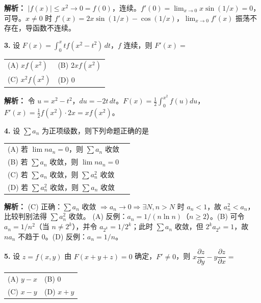 \ifshowsolutions\par\noindent\textbf{解析：} $|f(x)|\leqslant x^2\to0=f(0)$，连续。$f'(0)=\lim_{x\to0}x\sin(1/x)=0$，可导。$x\neq0$ 时 $f'(x)=2x\sin(1/x)-\cos(1/x)$，$\lim_{x\to0}f'(x)$ 振荡不存在，导函数不连续。\else \answerarea \fi

\vspace{8pt}

\textbf{3.} 设 $F(x) = \displaystyle\int_{0}^{x} t f(x^2-t^2)\,dt$，$f$ 连续，则 $F'(x) =$
\begin{center}
\begin{tabular}{ll}
(A) $x f(x^2)$ & (B) $2x f(x^2)$ \\[6pt]
(C) $x^2 f(x^2)$ & (D) $0$
\end{tabular}
\end{center}

\ifshowsolutions\par\noindent\textbf{解析：} 令 $u=x^2-t^2$，$du=-2t\,dt$。$F(x)=\frac{1}{2}\int_{0}^{x^2}f(u)du$，$F'(x)=\frac{1}{2}f(x^2)\cdot2x=x f(x^2)$。\else \answerarea \fi

\vspace{8pt}

\textbf{4.} 设 $\displaystyle\sum a_n$ 为正项级数，则下列命题正确的是
\begin{center}
\begin{tabular}{ll}
(A) 若 $\lim n a_n = 0$，则 $\sum a_n$ 收敛 \\[4pt]
(B) 若 $\sum a_n$ 收敛，则 $\lim n a_n = 0$ \\[4pt]
(C) 若 $\sum a_n$ 收敛，则 $\sum a_n^2$ 收敛 \\[4pt]
(D) 若 $\sum a_n^2$ 收敛，则 $\sum a_n$ 收敛
\end{tabular}
\end{center}

\ifshowsolutions\par\noindent\textbf{解析：} (C) 正确：$\sum a_n$ 收敛 $\Rightarrow a_n\to0\Rightarrow\exists N,n>N$ 时 $a_n<1$，故 $a_n^2<a_n$，比较判别法得 $\sum a_n^2$ 收敛。
(A) 反例：$a_n=1/(n\ln n)$（$n\geq2$）。(B) 可令 $a_n=1/n^2$（当 $n\neq2^k$），并令 $a_{2^k}=1/2^k$；此时 $\sum a_n$ 收敛，但 $2^k a_{2^k}=1$，故 $na_n$ 不趋于 $0$。(D) 反例：$a_n=1/n$。\else \answerarea \fi

\vspace{8pt}

\textbf{5.} 设 $z=f(x,y)$ 由 $F(x+y+z)=0$ 确定，$F'\neq0$，则 $x\dfrac{\partial z}{\partial y} - y\dfrac{\partial z}{\partial x}=$
\begin{center}
\begin{tabular}{ll}
(A) $y-x$ & (B) $0$ \\[6pt]
(C) $x-y$ & (D) $x+y$
\end{tabular}
\end{center}

